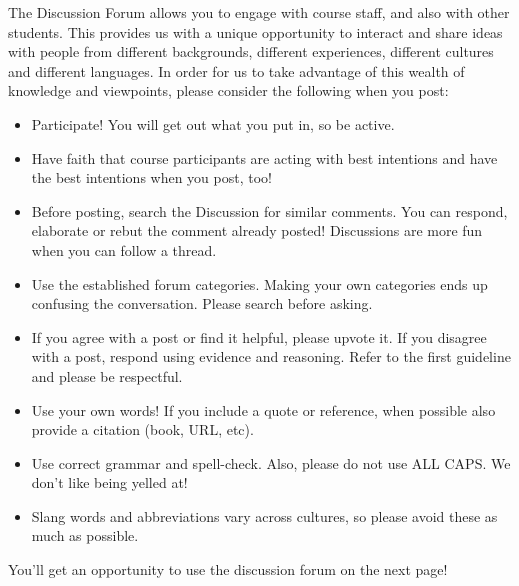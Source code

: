 \endedxtext


\endedxvertical



The Discussion Forum allows you to engage with course staff, and also with other students. This provides us with a unique opportunity to interact and share ideas with people from different backgrounds, different experiences, different cultures and different languages. In order for us to take advantage of this wealth of knowledge and viewpoints, please consider the following when you post:

\begin{itemize}
\item
Participate! You will get out what you put in, so be active.
\item
Have faith that course participants are acting with best intentions and have the best intentions when you post, too!

\item
Before posting, search the Discussion for similar comments. You can respond, elaborate or rebut the comment already posted! Discussions are more fun when you can follow a thread.

\item
Use the established forum categories. Making your own categories ends up confusing the conversation. Please search before asking.

\item
If you agree with a post or find it helpful, please upvote it. If you disagree with a post, respond using evidence and reasoning. Refer to the first guideline and please be respectful.

\item
Use your own words! If you include a quote or reference, when possible also provide a citation (book, URL, etc).

\item
Use correct grammar and spell-check. Also, please do not use ALL CAPS. We don't like being yelled at!

\item
Slang words and abbreviations vary across cultures, so please avoid these as much as possible.

\end{itemize}

You'll get an opportunity to use the discussion forum on the next page!  

\endedxtext



